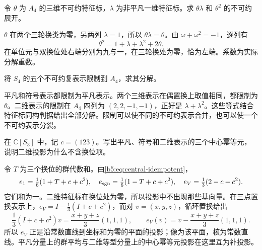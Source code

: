 \begin{exercise}\label{b5:ex:02-a4-tensor}
	令 \(\theta\) 为 \(A_4\) 的三维不可约特征标，\(\lambda\) 为非平凡一维特征标。求 \(\theta\lambda\) 和 \(\theta^2\) 的不可约展开。
\end{exercise}
\begin{solution}
	\(\theta\) 在两个三轮换类为零，另两列 \(\lambda=1\)，所以 \(\theta\lambda=\theta\)。由 \(\omega+\omega^2=-1\)，逐列有
	\[
		\theta^2=1+\lambda+\lambda^2+2\theta.
	\]
	在单位元与双换位处右端分别为九与一，在三轮换处为零，恰为左端。系数为实际分解重数。
\end{solution}

\begin{exercise}\label{b5:ex:02-s4-restriction}
	将 \(S_4\) 的五个不可约复表示限制到 \(A_4\)，求其分解。
\end{exercise}
\begin{solution}
	平凡和符号表示都限制为平凡表示。两个三维表示在偶置换上取值相同，都限制为 \(\theta\)。二维表示的限制在 \(A_4\) 四列为 \((2,2,-1,-1)\)，正好是 \(\lambda+\lambda^2\)。这些等式结合特征标同构判据给出全部分解。限制可以使不同的不可约表示合并，也可以使一个不可约表示分裂。
\end{solution}

\begin{exercise}\label{b5:ex:02-s3-central-projectors}
	在 \(\mathbb C[S_3]\) 中，记 \(c=(123)\)。写出平凡、符号和二维表示的三个中心幂等元，说明二维投影为什么不含换位项。
\end{exercise}
\begin{solution}
	令 \(T\) 为三个换位的群代数和。由\eqref{b5:eq:central-idempotent}，
	\[
		e_1=\tfrac16(1+T+c+c^2),\quad e_{\rm sgn}=\tfrac16(1-T+c+c^2),\quad e_V=\tfrac13(2-c-c^2).
	\]
	它们和为一。二维特征标在换位处为零，所以投影中不出现那些基向量。在三点置换表示上，\(e_V=I-\frac13(I+c+c^2)\)，而对 \(v=(x,y,z)\)，循环置换给出
	\[
		\frac13(I+c+c^2)v=\frac{x+y+z}{3}(1,1,1),\qquad e_V(v)=v-\frac{x+y+z}{3}(1,1,1).
	\]
	所以 \(e_V\) 正是沿常数直线到坐标和为零的平面的投影；像为该平面，核为常数直线。平凡分量上的群平均与二维等型分量上的中心幂等元投影在这里互为补投影。
\end{solution}

